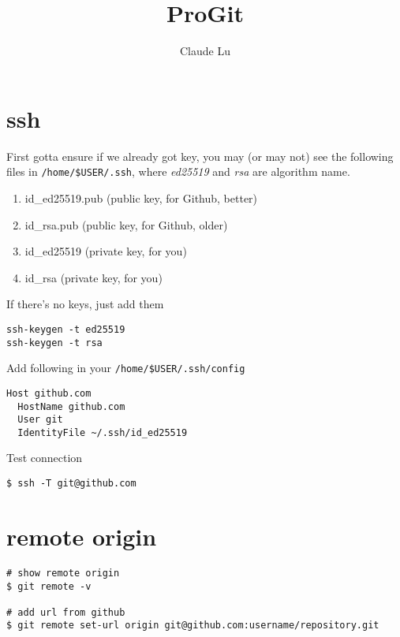 \documentclass[12pt,a4paper]{article}
\title{ProGit}
\author{Claude Lu}
\begin{document}
\maketitle

\section{ssh}
First gotta ensure if we already got key, you may (or may not) see the following files in \texttt{/home/\${USER}/.ssh}, where \textit{ed25519} and \textit{rsa} are algorithm name.
\begin{enumerate}
	\item id\_ed25519.pub (public key, for Github, better)
	\item id\_rsa.pub (public key, for Github, older)
	\item id\_ed25519 (private key, for you)
	\item id\_rsa (private key, for you)
\end{enumerate}

\noindent If there's no keys, just add them
\begin{footnotesize}
\begin{verbatim}
ssh-keygen -t ed25519
ssh-keygen -t rsa
\end{verbatim}
\end{footnotesize}

\noindent Add following in your \texttt{/home/\${USER}/.ssh/config}
\begin{footnotesize}
\begin{verbatim}
Host github.com
  HostName github.com
  User git
  IdentityFile ~/.ssh/id_ed25519
\end{verbatim}
\end{footnotesize}

\noindent Test connection
\begin{footnotesize}
\begin{verbatim}
$ ssh -T git@github.com
\end{verbatim}
\end{footnotesize}

\section{remote origin}
\begin{footnotesize}
\begin{verbatim}
# show remote origin
$ git remote -v

# add url from github
$ git remote set-url origin git@github.com:username/repository.git
\end{verbatim}
\end{footnotesize}
\end{document}
